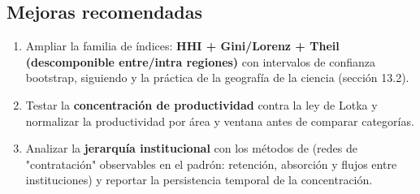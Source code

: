\subsection{Mejoras recomendadas}

\begin{enumerate}
  \item Ampliar la familia de índices: \textbf{HHI + Gini/Lorenz + Theil
        (descomponible entre/intra regiones)} con intervalos de confianza
        bootstrap, siguiendo \citep{theil1967economics} y la práctica de la
        geografía de la ciencia (sección 13.2).
  \item Testar la \textbf{concentración de productividad} contra la ley de
        Lotka \citep{lotka1926frequency} y normalizar la productividad por área
        y ventana antes de comparar categorías.
  \item Analizar la \textbf{jerarquía institucional} con los métodos de
        \citet{clauset2015systematic} (redes de "contratación" observables en el
        padrón: retención, absorción y flujos entre instituciones) y reportar
        la persistencia temporal de la concentración.
\end{enumerate}
